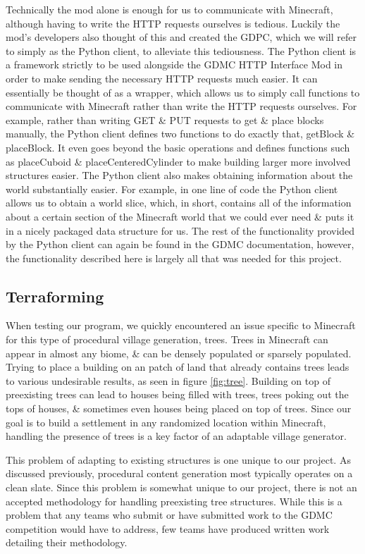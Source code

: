 \documentclass[11pt, oneside]{article}
\begin{document}
\begin{normalsize}
Technically the mod alone is enough for us to communicate with Minecraft, although having to write the HTTP requests ourselves is tedious. 
Luckily the mod's developers also thought of this and created the GDPC, which we will refer to simply as the Python client, to alleviate this tediousness. 
The Python client is a framework strictly to be used alongside the GDMC HTTP Interface Mod in order to make sending the necessary HTTP requests much easier. 
It can essentially be thought of as a wrapper, which allows us to simply call functions to communicate with Minecraft rather than write the HTTP requests ourselves. 
For example, rather than writing GET \& PUT requests to get \& place blocks manually, the Python client defines two functions to do exactly that, getBlock \& placeBlock. 
It even goes beyond the basic operations and defines functions such as placeCuboid \& placeCenteredCylinder to make building larger more involved structures easier. 
The Python client also makes obtaining information about the world substantially easier. 
For example, in one line of code the Python client allows us to obtain a world slice, which, in short, contains all of the information about a certain section of the Minecraft world that we could ever need \& puts it in a nicely packaged data structure for us. 
The rest of the functionality provided by the Python client can again be found in the GDMC documentation, however, the functionality described here is largely all that was needed for this project. 


\subsection{Terraforming}

When testing our program, we quickly encountered an issue specific to Minecraft for this type of procedural village generation, trees. Trees in Minecraft can appear in almost any biome, \& can be densely populated or sparsely populated. Trying to place a building on an patch of land that already contains trees leads to various undesirable results, as seen in figure \ref{fig:tree}. Building on top of preexisting trees can lead to houses being filled with trees, trees poking out the tops of houses, \& sometimes even houses being placed on top of trees. Since our goal is to build a settlement in any randomized location within Minecraft, handling the presence of trees is a key factor of an adaptable village generator.

This problem of adapting to existing structures is one unique to our project. As discussed previously, procedural content generation most typically operates on a clean slate. Since this problem is somewhat unique to our project, there is not an accepted methodology for handling preexisting tree structures. While this is a problem that any teams who submit or have submitted work to the GDMC competition would have to address, few teams have produced written work detailing their methodology.


\end{normalsize}
\end{document}

